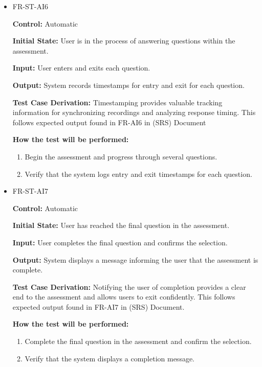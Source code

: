 \documentclass[12pt, titlepage]{article}
\begin{document}
\begin{itemize}
  \item FR-ST-AI6
    \begin{mdframed}[linewidth=0.5mm]
      \textbf{Control:} Automatic \par
      \textbf{Initial State:} User is in the process of answering questions within the assessment. \par
      \textbf{Input:} User enters and exits each question. \par
      \textbf{Output:} System records timestamps for entry and exit for each question. \par
      \textbf{Test Case Derivation:} Timestamping provides valuable tracking information for 
      synchronizing recordings and analyzing response timing. 
      This follows expected output found in FR-AI6 in (SRS) Document \par
      \textbf{How the test will be performed:}
      \begin{enumerate}[noitemsep]
        \item Begin the assessment and progress through several questions.
        \item Verify that the system logs entry and exit timestamps for each question.
      \end{enumerate}
    \end{mdframed}

  \item FR-ST-AI7
    \begin{mdframed}[linewidth=0.5mm]
      \textbf{Control:} Automatic \par
      \textbf{Initial State:} User has reached the final question in the assessment. \par
      \textbf{Input:} User completes the final question and confirms the selection. \par
      \textbf{Output:} System displays a message informing the user that the assessment is complete. \par
      \textbf{Test Case Derivation:} Notifying the user of completion provides a clear end to 
      the assessment and allows users to exit confidently. 
      This follows expected output found in FR-AI7 in (SRS) Document. \par
      \textbf{How the test will be performed:}
      \begin{enumerate}[noitemsep]
        \item Complete the final question in the assessment and confirm the selection.
        \item Verify that the system displays a completion message.
      \end{enumerate}
    \end{mdframed}
\end{itemize}
\end{document}
